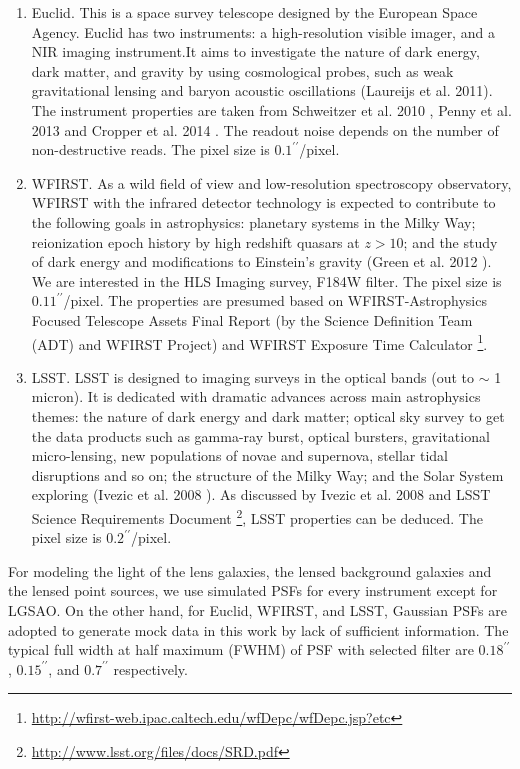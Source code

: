 \documentclass[a4paper,11pt]{article}
\begin{document}
\begin{enumerate}
\item Euclid. This is a space survey telescope designed by the European Space Agency. Euclid has two instruments: a high-resolution visible imager, and a NIR imaging instrument.It aims to investigate the nature of dark energy, dark matter, and gravity by using cosmological probes, such as weak gravitational lensing and baryon acoustic oscillations (Laureijs et al. 2011). The instrument properties are taken from Schweitzer et al. 2010 \cite{2010SPIE.7731E..1KS}, Penny et al. 2013 \cite{2013MNRAS.434....2P} and Cropper et al. 2014 \cite{2014SPIE.9143E..0JC}. The readout noise depends on the number of non-destructive reads. The pixel size is $0.1^{\prime\prime}$/pixel.
  
\item WFIRST. As a wild field of view and low-resolution spectroscopy observatory, WFIRST with the infrared detector technology is expected to contribute to the following goals in astrophysics: planetary systems in the Milky Way; reionization epoch history by high redshift quasars at $z>10$; and the study of dark energy and modifications to Einstein's gravity (Green et al. 2012 \cite{2012arXiv1208.4012G}). We are interested in the HLS Imaging survey, F184W filter. The pixel size is $0.11^{\prime\prime}$/pixel. The properties are presumed based on WFIRST-Astrophysics Focused Telescope Assets Final Report (by the Science Definition Team (ADT) and WFIRST Project) and WFIRST Exposure Time Calculator \footnote{\url{http://wfirst-web.ipac.caltech.edu/wfDepc/wfDepc.jsp?etc}}.
    
\item LSST. LSST is designed to imaging surveys in the optical bands (out to $\sim$ 1 micron). It is dedicated with dramatic advances across main astrophysics themes: the nature of dark energy and dark matter; optical sky survey to get the data products such as gamma-ray burst, optical bursters, gravitational micro-lensing, new populations of novae and supernova, stellar tidal disruptions and so on; the structure of the Milky Way; and the Solar System exploring (Ivezic et al. 2008 \cite{2008arXiv0805.2366I}). As discussed by Ivezic et al. 2008 and LSST Science Requirements Document \footnote{\url{http://www.lsst.org/files/docs/SRD.pdf}}, LSST properties can be deduced. The pixel size is $0.2^{\prime\prime}$/pixel.

\end{enumerate}

For modeling the light of the lens galaxies, the lensed background galaxies and the lensed point sources,
we use simulated PSFs for every instrument except for LGSAO.
On the other hand, for Euclid, WFIRST, and LSST, Gaussian PSFs are adopted to generate mock data in this work by lack of sufficient information. The typical full width at half maximum (FWHM) of PSF with selected filter are $0.18^{\prime\prime}$, $0.15^{\prime\prime}$, and $0.7^{\prime\prime}$ respectively.
\end{document}
